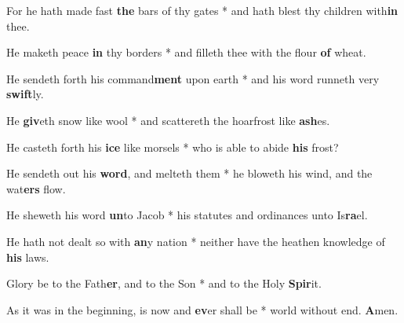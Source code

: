 \begin{multicols}{2}
	For he hath made fast \textbf{the} bars of thy gates * and hath blest thy children with\textbf{in} thee.
	
	He maketh peace \textbf{in} thy borders * and filleth thee with the flour \textbf{of} wheat.
	
	He sendeth forth his command\textbf{ment} upon earth * and his word runneth very \textbf{swift}ly.
	
	He \textbf{giv}eth snow like wool * and scattereth the hoarfrost like \textbf{ash}es.
	
	He casteth forth his \textbf{ice} like morsels * who is able to abide \textbf{his} frost?
	
	He sendeth out his \textbf{word}, and melteth them * he bloweth his wind, and the wat\textbf{ers} flow.
	
	He sheweth his word \textbf{un}to Jacob * his statutes and ordinances unto Is\textbf{ra}el.
	
	He hath not dealt so with \textbf{an}y nation * neither have the heathen knowledge of \textbf{his} laws.
	
	Glory be to the Fath\textbf{er}, and to the Son * and to the Holy \textbf{Spir}it.
	
	As it was in the beginning, is now and \textbf{ev}er shall be * world without end. \textbf{A}men.
\end{multicols}